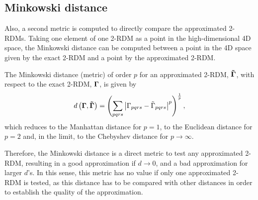 \subsection{Minkowski distance}
Also, a second metric is computed to directly compare the approximated 2-RDMs.
Taking one element of one 2-RDM as a point in the high-dimensional 4D space,
the Minkowski distance can be computed between a point in the 4D space given by the
exact 2-RDM and a point by the approximated 2-RDM.

The Minkowski distance (metric) of order $p$ for an approximated 2-RDM,
$ \boldsymbol{\mathrm{\tilde{\Gamma}}}$, with respect to the exact 2-RDM, $ \boldsymbol{\mathrm{\Gamma}}$,
is given by 
\begin{equation}
    d \left( \boldsymbol{\mathrm{\Gamma}} , \boldsymbol{\mathrm{\tilde{\Gamma}}} \right) =
    \left(
        \sum_{pqrs} \left| \Gamma_{pqrs} - \tilde{\Gamma}_{pqrs} \right|^p
    \right)^{\frac{1}{p}}
    ,
\end{equation}
which reduces to the Manhattan distance for $p=1$, to the Euclidean distance
for $p=2$ and, in the limit, to the Chebyshev distance for $p \to \infty$.

Therefore, the Minkowski distance is a direct metric to test any approximated
2-RDM, resulting in a good approximation if $d \to 0$, and a bad approximation
for larger $d$'s.
In this sense, this metric has no value if only one approximated 2-RDM is tested,
as this distance has to be compared with other distances in order to establish
the quality of the approximation.

